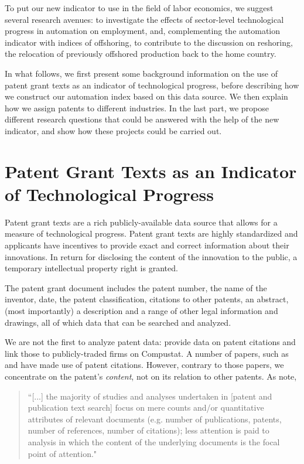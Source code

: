 \documentclass[11pt,a4paper]{article}
\begin{document}
To put our new indicator to use in the field of labor economics, we suggest several research avenues: to investigate the effects of sector-level technological progress in automation on employment, and, complementing the automation indicator with indices of offshoring, to contribute to the discussion on reshoring, the relocation of previously offshored production back to the home country.

In what follows, we first present some background information on the use of patent grant texts as an indicator of technological progress, before describing how we construct our automation index based on this data source. We then explain how we assign patents to different industries. In the last part, we propose different research questions that could be answered with the help of the new indicator, and show how these projects could be carried out.


\section{Patent Grant Texts as an Indicator of Technological Progress}
Patent grant texts are a rich publicly-available data source that allows for a measure of technological progress. Patent grant texts are highly standardized and applicants have incentives to provide exact and correct information about their innovations. In return for disclosing the content of the innovation to the public, a temporary intellectual property right is granted. 

The patent grant document includes the patent number, the name of the inventor, date, the patent classification, citations to other patents, an abstract, (most importantly) a description and a range of other legal information and drawings, all of which data that can be searched and analyzed. 

We are not the first to analyze patent data: \cite{HJT2001} provide data on patent citations and link those to publicly-traded firms on Compustat. A number of papers, such as \cite{AAC2014} and \cite{ABP2015} have made use of patent citations. However, contrary to those papers, we concentrate on the patent's \textit{content}, not on its relation to other patents. As \citep[p.~290]{MVS2010} note, 
\begin{quotation} 
``[...] the majority of studies and analyses undertaken in [patent and publication text search] focus on mere counts and/or quantitative attributes of relevant documents (e.g. number of publications, patents, number of references, number of citations); less attention is paid to analysis in which the content of the underlying documents is the focal point of attention."
\end{quotation}
\end{document}
